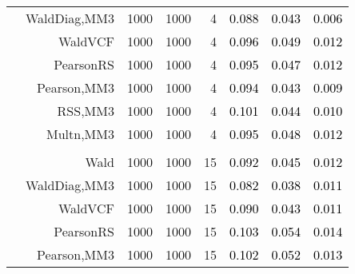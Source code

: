 \documentclass[
]{article}
\begin{document}
\begin{table}[H]
{\begin{tabular}[t]{lrrrrrrr}
\hspace{1em} & WaldDiag,MM3 & 1000 & 1000 & 4 & \textcolor{black}{0.088} & \textcolor{black}{0.043} & \textcolor{black}{0.006}\\

\hspace{1em} & WaldVCF & 1000 & 1000 & 4 & \textcolor{black}{0.096} & \textcolor{black}{0.049} & \textcolor{black}{0.012}\\

\hspace{1em} & PearsonRS & 1000 & 1000 & 4 & \textcolor{black}{0.095} & \textcolor{black}{0.047} & \textcolor{black}{0.012}\\

\hspace{1em} & Pearson,MM3 & 1000 & 1000 & 4 & \textcolor{black}{0.094} & \textcolor{black}{0.043} & \textcolor{black}{0.009}\\

\hspace{1em} & RSS,MM3 & 1000 & 1000 & 4 & \textcolor{black}{0.101} & \textcolor{black}{0.044} & \textcolor{black}{0.010}\\

\hspace{1em} & Multn,MM3 & 1000 & 1000 & 4 & \textcolor{black}{0.095} & \textcolor{black}{0.048} & \textcolor{black}{0.012}\\
\cmidrule{1-8}
\addlinespace[0.3em]
\multicolumn{8}{l}{\textbf{1F 15V}}\\
\hspace{1em} & Wald & 1000 & 1000 & 15 & \textcolor{black}{0.092} & \textcolor{black}{0.045} & \textcolor{black}{0.012}\\

\hspace{1em} & WaldDiag,MM3 & 1000 & 1000 & 15 & \textcolor{black}{0.082} & \textcolor{black}{0.038} & \textcolor{black}{0.011}\\

\hspace{1em} & WaldVCF & 1000 & 1000 & 15 & \textcolor{black}{0.090} & \textcolor{black}{0.043} & \textcolor{black}{0.011}\\

\hspace{1em} & PearsonRS & 1000 & 1000 & 15 & \textcolor{black}{0.103} & \textcolor{black}{0.054} & \textcolor{black}{0.014}\\

\hspace{1em} & Pearson,MM3 & 1000 & 1000 & 15 & \textcolor{black}{0.102} & \textcolor{black}{0.052} & \textcolor{black}{0.013}\\


\end{tabular}}
\end{table}
\end{document}
